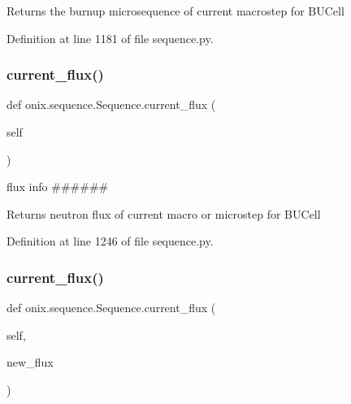 \begin{DoxyVerb}Returns the burnup microsequence of current macrostep
for BUCell\end{DoxyVerb}
 

Definition at line 1181 of file sequence.\+py.

\mbox{\label{classonix_1_1sequence_1_1Sequence_aab433adc6fcbeb9147dead2512d435a1}} 
\subsubsection{\texorpdfstring{current\+\_\+flux()}{current\_flux()}\hspace{0.1cm}{\footnotesize\ttfamily [1/2]}}
{\footnotesize\ttfamily def onix.\+sequence.\+Sequence.\+current\+\_\+flux (\begin{DoxyParamCaption}\item[{}]{self }\end{DoxyParamCaption})}



flux info \#\#\#\#\#\# 

\begin{DoxyVerb}Returns neutron flux of current macro or microstep
for BUCell\end{DoxyVerb}
 

Definition at line 1246 of file sequence.\+py.

\mbox{\label{classonix_1_1sequence_1_1Sequence_a28dc898856ce65054f85f4f7fea580d4}} 
\subsubsection{\texorpdfstring{current\+\_\+flux()}{current\_flux()}\hspace{0.1cm}{\footnotesize\ttfamily [2/2]}}
{\footnotesize\ttfamily def onix.\+sequence.\+Sequence.\+current\+\_\+flux (\begin{DoxyParamCaption}\item[{}]{self,  }\item[{}]{new\+\_\+flux }\end{DoxyParamCaption})}

